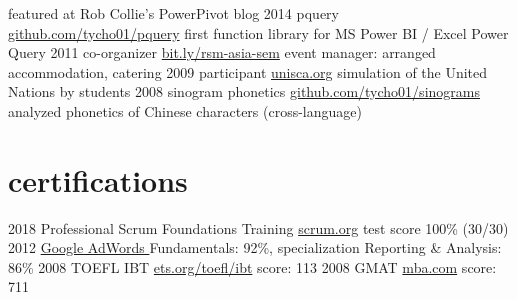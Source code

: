 \documentclass[]{friggeri-cv}
\begin{document}
\begin{entrylist}
    {
      featured at
      Rob Collie's PowerPivot blog
    }
  \entry
    {2014}
    {pquery}
    {\href{https://github.com/KiaraGrouwstra/pquery}{github.com/tycho01/pquery}}
    {
      first function library for
      MS Power BI / Excel Power Query
    }
  \entry
    {2011}
    {%
co-organizer
    }
    {\href{https://www.facebook.com/Doing-Business-in-Asia-Seminar-310520148998549/}{bit.ly/rsm-asia-sem}}
    {
      event manager:
      arranged accommodation, catering
    }
  \entry
    {2009}
    {%
participant
    }
    {\href{http://unisca.org/}{unisca.org}}
    {
      simulation of the United Nations by students
    }
  \entry
    {2008}
    {%
sinogram phonetics
    }
    {\href{https://github.com/KiaraGrouwstra/sinograms}{github.com/tycho01/sinograms}}
    {
      analyzed phonetics of Chinese characters (cross-language)
    }
\end{entrylist}

\section{certifications}

\begin{entrylist}
  \entry
    {2018}
    {Professional Scrum Foundations Training}
    {\href{https://www.scrum.org/courses/professional-scrum-foundations-training}{scrum.org}}
    {test score 100\% (30/30)}
  \entry
    {2012}
    {\href{https://support.google.com/partners/answer/3154326}{Google AdWords }}
    {}
    {Fundamentals: 92\%,
    specialization
    Reporting \& Analysis: 86\%}
  \entry
    {2008}
    {TOEFL IBT}
    {\href{https://www.ets.org/toefl/ibt}{ets.org/toefl/ibt}}
    {score: 113}
  \entry
    {2008}
    {GMAT}
    {\href{https://www.mba.com/}{mba.com}}
    {score: 711}
\end{entrylist}
\end{document}
